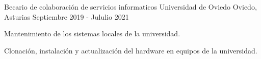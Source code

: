 \begin{cventries}
    \cventry
    {Becario de colaboración de servicios informaticos} %
    {Universidad de Oviedo} %
    {Oviedo, Asturias} %
    {Septiembre 2019 - Jululio 2021} %
    {
        \begin{cvitems} %
            \item {Mantenimiento de los sistemas locales de la universidad.}
            \item {Clonación, instalación y actualización del hardware en equipos de la universidad.}
        \end{cvitems}
    }

\end{cventries}
